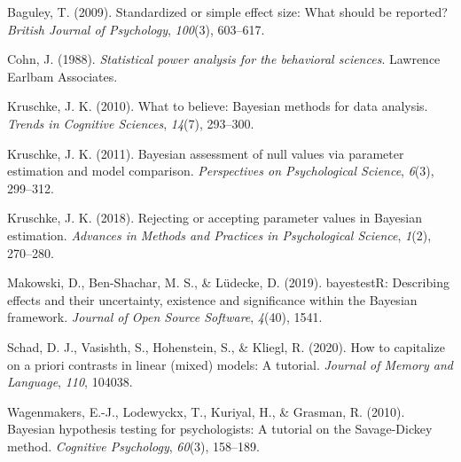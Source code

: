 \documentclass[
  english,
  man,floatsintext]{apa7}
\newlength{\cslhangindent}
\newenvironment{cslreferences}%
  {\setlength{\parindent}{0pt}%
  \everypar{\setlength{\hangindent}{\cslhangindent}}\ignorespaces}%
  {\par}
\begin{document}
\hypertarget{refs}{}
\begin{cslreferences}
\leavevmode\hypertarget{ref-baguley2009standardized}{}%
Baguley, T. (2009). Standardized or simple effect size: What should be reported? \emph{British Journal of Psychology}, \emph{100}(3), 603--617.

\leavevmode\hypertarget{ref-cohn1988statistical}{}%
Cohn, J. (1988). \emph{Statistical power analysis for the behavioral sciences}. Lawrence Earlbam Associates.

\leavevmode\hypertarget{ref-kruschke2010believe}{}%
Kruschke, J. K. (2010). What to believe: Bayesian methods for data analysis. \emph{Trends in Cognitive Sciences}, \emph{14}(7), 293--300.

\leavevmode\hypertarget{ref-kruschke2011bayesian}{}%
Kruschke, J. K. (2011). Bayesian assessment of null values via parameter estimation and model comparison. \emph{Perspectives on Psychological Science}, \emph{6}(3), 299--312.

\leavevmode\hypertarget{ref-kruschke2018rejecting}{}%
Kruschke, J. K. (2018). Rejecting or accepting parameter values in Bayesian estimation. \emph{Advances in Methods and Practices in Psychological Science}, \emph{1}(2), 270--280.

\leavevmode\hypertarget{ref-makowski2019bayestestr}{}%
Makowski, D., Ben-Shachar, M. S., \& Lüdecke, D. (2019). bayestestR: Describing effects and their uncertainty, existence and significance within the Bayesian framework. \emph{Journal of Open Source Software}, \emph{4}(40), 1541.

\leavevmode\hypertarget{ref-schad2020capitalize}{}%
Schad, D. J., Vasishth, S., Hohenstein, S., \& Kliegl, R. (2020). How to capitalize on a priori contrasts in linear (mixed) models: A tutorial. \emph{Journal of Memory and Language}, \emph{110}, 104038.

\leavevmode\hypertarget{ref-wagenmakers2010bayesian}{}%
Wagenmakers, E.-J., Lodewyckx, T., Kuriyal, H., \& Grasman, R. (2010). Bayesian hypothesis testing for psychologists: A tutorial on the Savage-Dickey method. \emph{Cognitive Psychology}, \emph{60}(3), 158--189.
\end{cslreferences}
\end{document}
